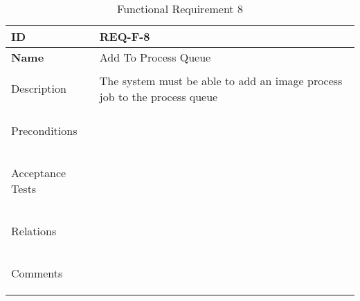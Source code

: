 \begin{table}[H]
    \begin{tabular}[t]{ | >{\bfseries}l | p{9.5cm} |}

    \hline
    ID
    &  REQ-F-8 \\ \hline

    Name
    & Add To Process Queue \\ \hline

    Description
    & The system must be able to add an image process job to the process queue \\ \hline

    Preconditions
    &  \\ \hline

    Acceptance Tests
    & \\ \hline

    Relations
    &  \\ \hline

    Comments
    &  \\ \hline

    \end{tabular}

    \caption{Functional Requirement 8}
    \label{fig:req_f_8}

\end{table}